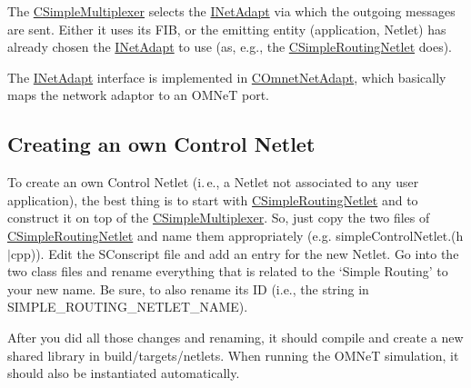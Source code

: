 The \hyperlink{classCSimpleMultiplexer}{CSimpleMultiplexer} selects the \hyperlink{classINetAdapt}{INetAdapt} via which the outgoing messages are sent. Either it uses its FIB, or the emitting entity (application, Netlet) has already chosen the \hyperlink{classINetAdapt}{INetAdapt} to use (as, e.g., the \hyperlink{classCSimpleRoutingNetlet}{CSimpleRoutingNetlet} does).

The \hyperlink{classINetAdapt}{INetAdapt} interface is implemented in \hyperlink{classCOmnetNetAdapt}{COmnetNetAdapt}, which basically maps the network adaptor to an OMNeT port.

\subsection{Creating an own Control Netlet}
\label{ch:noanex:tutorials:ctrlnetlet}

To create an own Control Netlet (i.\,e., a Netlet not associated to any user application), the best thing is to start with \hyperlink{classCSimpleRoutingNetlet}{CSimpleRoutingNetlet} and to construct it on top of the \hyperlink{classCSimpleMultiplexer}{CSimpleMultiplexer}. So, just copy the two files of \hyperlink{classCSimpleRoutingNetlet}{CSimpleRoutingNetlet} and name them appropriately (e.g. simpleControlNetlet.(h$|$cpp)). Edit the SConscript file and add an entry for the new Netlet. Go into the two class files and rename everything that is related to the `Simple Routing' to your new name. Be sure, to also rename its ID (i.e., the string in SIMPLE\_\-ROUTING\_\-NETLET\_\-NAME).

After you did all those changes and renaming, it should compile and create a new shared library in build/targets/netlets. When running the OMNeT simulation, it should also be instantiated automatically.


